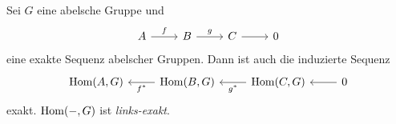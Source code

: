 \setcounter{prop}{3}
\begin{prop}
  Sei $G$ eine abelsche Gruppe und
  \begin{equation*}
    \begin{tikzcd}
      A \arrow{r}{f}  & B
        \arrow{r}{g}  & C
        \arrow{r}{}   & 0
    \end{tikzcd}
  \end{equation*}
  eine exakte Sequenz abelscher Gruppen. Dann ist auch die induzierte Sequenz
  \begin{equation*}
    \begin{tikzcd}
      \Hom(A,G) & \Hom(B,G) \arrow{l}{f^*}
                & \Hom(C,G) \arrow{l}{g^*}
                & 0         \arrow{l}{}
    \end{tikzcd}
  \end{equation*}
  exakt. $\mathrm{Hom}(-,G)$ ist \emph{links-exakt}.
\end{prop}
